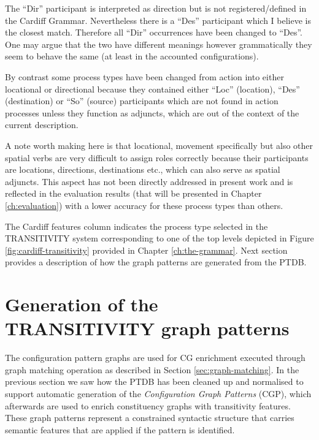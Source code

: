     The ``Dir'' participant is interpreted as direction but is not registered/defined in the Cardiff Grammar. Nevertheless there is a ``Des'' participant which I believe is the closest match. Therefore all ``Dir'' occurrences have been changed to ``Des''. One may argue that the two have different meanings however grammatically they seem to behave the same (at least in the accounted configurations). 

    By contrast some process types have been changed from action into either locational or directional because they contained either ``Loc'' (location), ``Des'' (destination) or ``So'' (source) participants which are not found in action processes unless they function as adjuncts, which are out of the context of the current description.

    A note worth making here is that locational, movement specifically but also other spatial verbs are very difficult to assign roles correctly because their participants are locations, directions, destinations etc., which can also serve as spatial adjuncts. This aspect has not been directly addressed in present work and is reflected in the evaluation results (that will be presented in Chapter \ref{ch:evaluation}) with a lower accuracy for these process types than others.

    The Cardiff features column indicates the process type selected in the TRANSITIVITY system corresponding to one of the top levels depicted in Figure \ref{fig:cardiff-transitivity} provided in Chapter \ref{ch:the-grammar}. Next section provides a description of how the graph patterns are generated from the PTDB. 

\section{Generation of the TRANSITIVITY graph patterns}
\label{sec:gen-sem}
    The configuration pattern graphs are used for CG enrichment executed through graph matching operation as described in Section \ref{sec:graph-matching}. In the previous section we saw how the PTDB has been cleaned up and normalised to support automatic generation of the \textit{Configuration Graph Patterns} (CGP), which afterwards are used to enrich constituency graphs with transitivity features. These graph patterns represent a constrained syntactic structure that carries semantic features that  are applied if the pattern is identified. 

